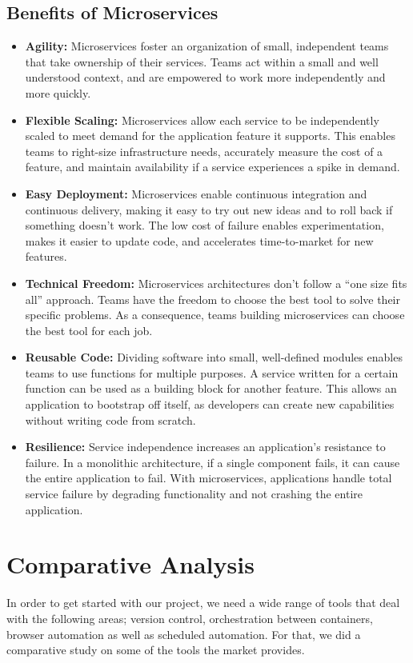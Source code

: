 \subsection{Benefits of Microservices}
\begin{itemize}
    \item \textbf{Agility:} Microservices foster an organization of small, independent teams that take ownership of their services. Teams act within a small and well understood context, and are empowered to work more independently and more quickly.
    \item \textbf{Flexible Scaling:} Microservices allow each service to be independently scaled to meet demand for the application feature it supports. This enables teams to right-size infrastructure needs, accurately measure the cost of a feature, and maintain availability if a service experiences a spike in demand.
    \item \textbf{Easy Deployment:} Microservices enable continuous integration and continuous delivery, making it easy to try out new ideas and to roll back if something doesn’t work. The low cost of failure enables experimentation, makes it easier to update code, and accelerates time-to-market for new features.
    \item \textbf{Technical Freedom:} Microservices architectures don’t follow a “one size fits all” approach. Teams have the freedom to choose the best tool to solve their specific problems. As a consequence, teams building microservices can choose the best tool for each job.
    \item \textbf{Reusable Code:} Dividing software into small, well-defined modules enables teams to use functions for multiple purposes. A service written for a certain function can be used as a building block for another feature. This allows an application to bootstrap off itself, as developers can create new capabilities without writing code from scratch.
    \item \textbf{Resilience:} Service independence increases an application’s resistance to failure. In a monolithic architecture, if a single component fails, it can cause the entire application to fail. With microservices, applications handle total service failure by degrading functionality and not crashing the entire application.
\end{itemize}

\section{Comparative Analysis}
In order to get started with our project, we need a wide range of tools that deal with the following areas; version control, orchestration between containers, browser automation as well as scheduled automation. For that, we did a comparative study on some of the tools the market provides.

